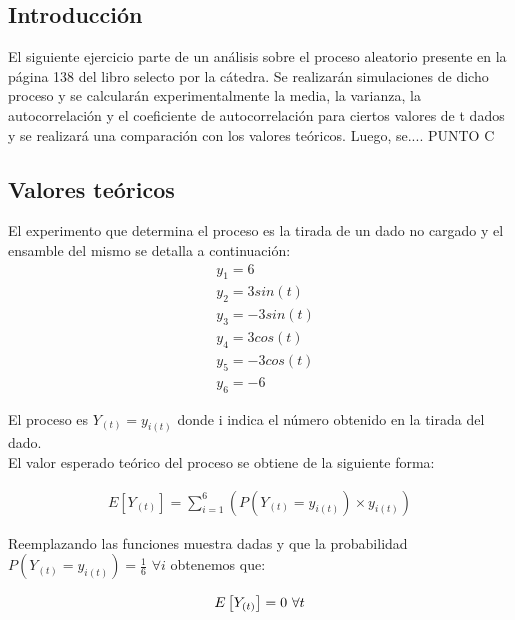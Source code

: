 

\subsection{Introducción}

El siguiente ejercicio parte de un análisis sobre el proceso aleatorio presente en la página 138 del libro selecto por la cátedra. Se realizarán simulaciones de dicho proceso y se calcularán experimentalmente la media, la varianza, la autocorrelación y el coeficiente de autocorrelación para ciertos valores de t dados y se realizará una comparación con los valores teóricos.
Luego, se.... PUNTO C 

\subsection{Valores teóricos}

El experimento que determina el proceso es la tirada de un dado no cargado y el ensamble del mismo se detalla a continuación:
\begin{equation} 
	\begin{split}
		 &y_{1} = 6 \\
		 &y_{2} = 3sin(t) \\
		 &y_{3} = -3sin(t) \\
		 &y_{4} = 3cos(t) \\
		 &y_{5} = -3cos(t) \\
		 &y_{6} = -6
	\end{split}
\end{equation}

El proceso es $Y_{(t)} = y_{i(t)}$ donde i indica el número obtenido en la tirada del dado.\\

El valor esperado teórico del proceso se obtiene de la siguiente forma:

\begin{equation*}
\begin{gathered}
	E\left[Y_{(t)}\right] = \sum_{i=1}^{6}\left( P(Y_{(t)} = y_{i(t)}) \times y_{i(t)}\right) 
\end{gathered}
\end{equation*}

Reemplazando las funciones muestra dadas y que la probabilidad $P(Y_{(t)} = y_{i(t)})= \frac{1}{6}$ $ \forall i $ obtenemos que:

\begin{equation*}
\begin{gathered}
	E\left[Y_{(t)}\right] = 0$ $\forall t 
\end{gathered}
\end{equation*}

